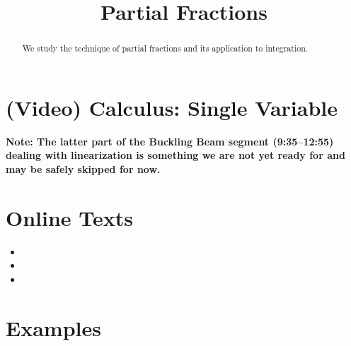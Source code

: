 \documentclass{ximera}
\title{Partial Fractions}
\begin{document}
\begin{abstract}
We study the technique of partial fractions and its application to integration.
\end{abstract}
\maketitle

\section*{(Video) Calculus: Single Variable}

\textbf{Note: The latter part of the Buckling Beam segment (9:35--12:55) dealing with linearization is something we are not yet ready for and may be safely skipped for now.}

\section*{Online Texts}
\begin{itemize}
\item {}
\item {}
\item {}
\end{itemize}


\section*{Examples}

\begin{example}

\end{example}

\begin{example}

\end{example}
\end{document}
